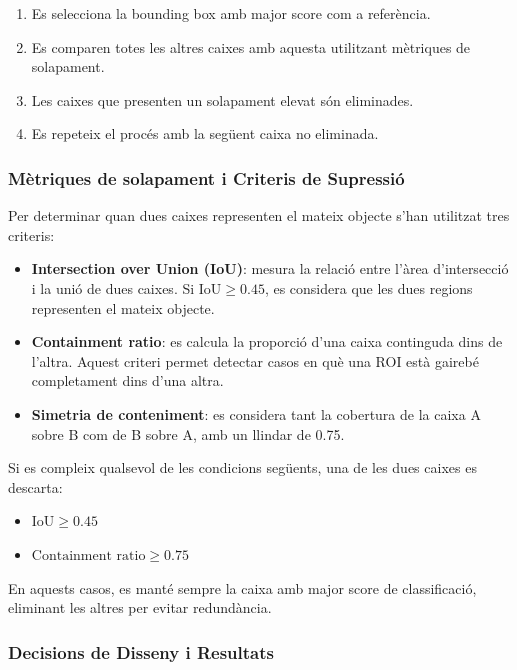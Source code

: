 \begin{enumerate}
    \item Es selecciona la bounding box amb major score com a referència.
    \item Es comparen totes les altres caixes amb aquesta utilitzant mètriques de solapament.
    \item Les caixes que presenten un solapament elevat són eliminades.
    \item Es repeteix el procés amb la següent caixa no eliminada.
\end{enumerate}

\subsubsection{Mètriques de solapament i Criteris de Supressió}

Per determinar quan dues caixes representen el mateix objecte s'han utilitzat tres criteris:

\begin{itemize}
    \item \textbf{Intersection over Union (IoU)}: mesura la relació entre l'àrea d'intersecció i la unió de dues caixes. Si $\text{IoU} \geq 0.45$, es considera que les dues regions representen el mateix objecte.

    \item \textbf{Containment ratio}: es calcula la proporció d'una caixa continguda dins de l'altra. Aquest criteri permet detectar casos en què una ROI està gairebé completament dins d'una altra.

    \item \textbf{Simetria de conteniment}: es considera tant la cobertura de la caixa A sobre B com de B sobre A, amb un llindar de 0.75.
\end{itemize}

Si es compleix qualsevol de les condicions següents, una de les dues caixes es descarta:

\begin{itemize}
    \item $\text{IoU} \geq 0.45$
    \item $\text{Containment ratio} \geq 0.75$
\end{itemize}

En aquests casos, es manté sempre la caixa amb major score de classificació, eliminant les altres per evitar redundància.

\subsubsection{Decisions de Disseny i Resultats}

